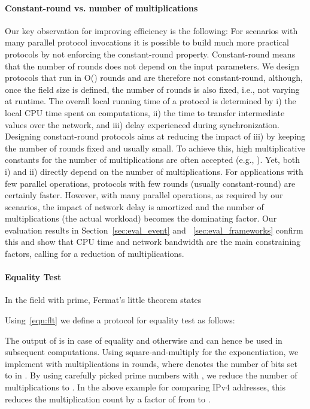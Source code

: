 \documentclass[letterpaper,11pt,onecolumn,titlepage]{article}
\begin{document}
\paragraph{Constant-round vs. number of multiplications}
Our key observation for improving efficiency is the following: For scenarios with many parallel protocol invocations it is 
possible to build much more practical protocols by not enforcing the constant-round property.
Constant-round means that the number of rounds does not depend on the input parameters. We design protocols that run in O() rounds and are therefore not constant-round, although, once the field size  is defined, the number of rounds is also fixed, i.e., not varying at runtime.
The overall local running time of a protocol is determined by i) the local CPU time spent on computations, ii) the time to transfer intermediate values over the network, and iii) delay experienced during synchronization.
Designing constant-round protocols aims at reducing the impact of iii) by keeping the number of rounds fixed and usually small. To achieve this, high multiplicative constants for the number of multiplications are often accepted (e.g., ). Yet, both i) and ii) directly depend on the number of multiplications. 
For applications with few parallel operations, protocols with few rounds (usually constant-round) are certainly faster. However, with many parallel operations, as required by our scenarios, the impact of network delay is amortized and the number of multiplications (the actual workload) becomes the dominating factor. Our evaluation results in Section~\ref{sec:eval_event} and ~\ref{sec:eval_frameworks} confirm this and show that CPU time and network bandwidth are the main constraining factors, calling for a reduction of multiplications.






\paragraph{Equality Test} 
In the field  with  prime, Fermat's little theorem states

Using~\eqref{eqn:flt} we define a protocol for equality test as follows:

The output of  is  in case of equality and  otherwise and can hence be used in subsequent computations. Using square-and-multiply for the exponentiation, we implement  with  multiplications in  rounds, where  denotes the number of bits set to  in . By using carefully picked prime numbers with , we reduce the number of multiplications to . In the above example for comparing IPv4 addresses, this reduces the multiplication count by a factor of  from  to .
\end{document}
